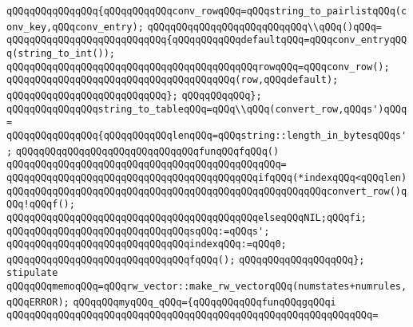 \verb|qQQqqQQqqQQqqQQq{qQQqqQQqqQQqconv_rowqQQq=qQQqstring_to_pairlistqQQq(conv_key,qQQqconv_entry);|\newline
\verb|qQQqqQQqqQQqqQQqqQQqqQQqqQQq\\qQQq()qQQq=|\newline
\verb|qQQqqQQqqQQqqQQqqQQqqQQqqQQq{qQQqqQQqqQQqdefaultqQQq=qQQqconv_entryqQQq(string_to_int());|\newline
\verb|qQQqqQQqqQQqqQQqqQQqqQQqqQQqqQQqqQQqqQQqqQQqrowqQQq=qQQqconv_row();|\newline
\verb|qQQqqQQqqQQqqQQqqQQqqQQqqQQqqQQqqQQqqQQq(row,qQQqdefault);|\newline
\verb|qQQqqQQqqQQqqQQqqQQqqQQqqQQq};|\newline
\verb|qQQqqQQqqQQq};|\newline
\newline
\verb|qQQqqQQqqQQqqQQqstring_to_tableqQQq=qQQq\\qQQq(convert_row,qQQqs')qQQq=|\newline
\verb|qQQqqQQqqQQqqQQq{qQQqqQQqqQQqlenqQQq=qQQqstring::length_in_bytesqQQqs';|\newline
\verb|qQQqqQQqqQQqqQQqqQQqqQQqqQQqqQQqfunqQQqfqQQq()|\newline
\verb|qQQqqQQqqQQqqQQqqQQqqQQqqQQqqQQqqQQqqQQqqQQqqQQq=|\newline
\verb|qQQqqQQqqQQqqQQqqQQqqQQqqQQqqQQqqQQqqQQqqQQqifqQQq(*indexqQQq<qQQqlen)|\newline
\verb|qQQqqQQqqQQqqQQqqQQqqQQqqQQqqQQqqQQqqQQqqQQqqQQqqQQqqQQqconvert_row()qQQq!qQQqf();|\newline
\verb|qQQqqQQqqQQqqQQqqQQqqQQqqQQqqQQqqQQqqQQqqQQqelseqQQqNIL;qQQqfi;|\newline
\verb|qQQqqQQqqQQqqQQqqQQqqQQqqQQqqQQqsqQQq:=qQQqs';|\newline
\verb|qQQqqQQqqQQqqQQqqQQqqQQqqQQqqQQqindexqQQq:=qQQq0;|\newline
\verb|qQQqqQQqqQQqqQQqqQQqqQQqqQQqqQQqfqQQq();|\newline
\verb|qQQqqQQqqQQqqQQqqQQq};|\newline
\newline
\verb|stipulate|\newline
\verb|qQQqqQQqmemoqQQq=qQQqrw_vector::make_rw_vectorqQQq(numstates+numrules,qQQqERROR);|\newline
\verb|qQQqqQQqmyqQQq_qQQq={qQQqqQQqqQQqfunqQQqgqQQqi|\newline
\verb|qQQqqQQqqQQqqQQqqQQqqQQqqQQqqQQqqQQqqQQqqQQqqQQqqQQqqQQqqQQqqQQq=|\newline
